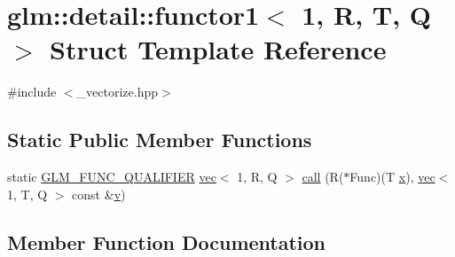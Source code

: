 \hypertarget{structglm_1_1detail_1_1functor1_3_011_00_01_r_00_01_t_00_01_q_01_4}{}\section{glm\+:\+:detail\+:\+:functor1$<$ 1, R, T, Q $>$ Struct Template Reference}
\label{structglm_1_1detail_1_1functor1_3_011_00_01_r_00_01_t_00_01_q_01_4}


{\ttfamily \#include $<$\+\_\+vectorize.\+hpp$>$}

\subsection*{Static Public Member Functions}
\begin{DoxyCompactItemize}
\item 
static \mbox{\hyperlink{setup_8hpp_a33fdea6f91c5f834105f7415e2a64407}{G\+L\+M\+\_\+\+F\+U\+N\+C\+\_\+\+Q\+U\+A\+L\+I\+F\+I\+ER}} \mbox{\hyperlink{structglm_1_1vec}{vec}}$<$ 1, R, Q $>$ \mbox{\hyperlink{structglm_1_1detail_1_1functor1_3_011_00_01_r_00_01_t_00_01_q_01_4_ab729a87fa4a02c97b5cfaadd1000488c}{call}} (R($\ast$Func)(T \mbox{\hyperlink{_s_d_l__opengl_8h_ad0e63d0edcdbd3d79554076bf309fd47}{x}}), \mbox{\hyperlink{structglm_1_1vec}{vec}}$<$ 1, T, Q $>$ const \&\mbox{\hyperlink{_s_d_l__opengl_8h_a10a82eabcb59d2fcd74acee063775f90}{v}})
\end{DoxyCompactItemize}


\subsection{Member Function Documentation}
\mbox{\label{structglm_1_1detail_1_1functor1_3_011_00_01_r_00_01_t_00_01_q_01_4_ab729a87fa4a02c97b5cfaadd1000488c}} 
